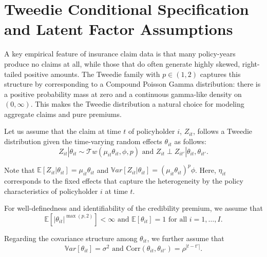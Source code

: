 \documentclass{sfuthesis}
\numberwithin{equation}{chapter}
\begin{document}
\section{Tweedie Conditional Specification and Latent Factor Assumptions}

A key empirical feature of insurance claim data is that many policy-years
produce no claims at all, while those that do often generate highly skewed,
right-tailed positive amounts. The Tweedie family with \(p \in (1,2)\) captures
this structure by corresponding to a Compound Poisson Gamma distribution:
there is a positive probability mass at zero and a continuous gamma-like
density on \((0,\infty)\). This makes the Tweedie distribution a natural choice
for modeling aggregate claims and pure premiums. 

Let us assume that the claim at time $t$ of policyholder $i$, $Z_{it}$, follows a Tweedie distribution given the time-varying random effects $\theta_{it}$ as follows:
\begin{equation} \label{condTweedie}
Z_{it}|\theta_{it} \sim \mathcal{T}w(\mu_{it}\theta_{it}, \phi, p) \text{ and } Z_{it} \perp Z_{it'}|\theta_{it}, \theta_{it'}.
\end{equation}


Note that $\mathbb{E}[Z_{it}|\theta_{it}]=\mu_{it}\theta_{it}$ and $\mathbb{V}ar[Z_{it}|\theta_{it}]=(\mu_{it}\theta_{it})^{p}\phi$. Here, $\eta_{it}$ corresponds to the fixed effects that capture the heterogeneity by the policy characteristics of policyholder $i$ at time $t$.


For well-definedness and identifiability of the credibility premium, we assume that
\begin{equation} \label{1stmoment}
\mathbb{E}[|\theta_{it}|^{\max(p,2)}]<\infty \text{ and } \mathbb{E}[\theta_{it}]=1 \text{ for all }  i=1,\ldots, I.
\end{equation} 

Regarding the covariance structure among $\theta_{it}$, we further assume that 
\begin{equation} \label{2ndmoment}
\mathbb{V}ar[\theta_{it}]=\sigma^{2} \text{ and } \text{Corr}(\theta_{it}, \theta_{it'})=\rho^{|t-t'|}.
\end{equation} 

\end{document}

